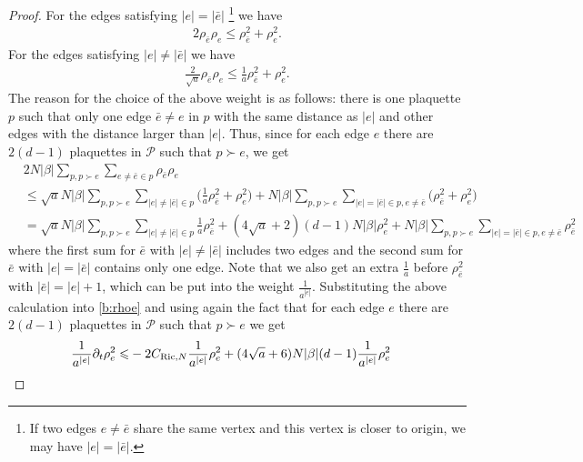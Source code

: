 \documentclass[11pt,UTF-8,reqno]{amsart}
\numberwithin{equation}{section}
\def\p{\partial}
\def\Ric{{\rm Ricci}}
\def\cP{{\mathcal P}}
\def\leq{\leqslant}
\def\p{\partial}
\def\Ric{{\rm Ric}}
\def\leq{\leqslant}
\begin{document}
\begin{proof}
\noindent For the edges satisfying $|e|= |\bar e|$ \footnote{If two edges $e\neq \bar e$ share the same vertex and this vertex is  closer to origin,  we may have $|e|= |\bar e|$.} we have
\begin{align*}
	2\rho_{\bar e}\rho_e\leq \rho_{\bar e}^2+\rho_e^2.
\end{align*}
For the edges satisfying $|e|\neq |\bar e|$  we have
\begin{align*}
	\frac2{\sqrt{a}}\rho_{\bar e}\rho_e\leq \frac1a\rho_{\bar e}^2+\rho_e^2.
\end{align*}
The reason for the choice of the above weight is as follows: there is one plaquette $p$ such that only one edge $\bar e\neq e$ in  $p$ with the same distance as $|e|$ and other edges  with the distance larger than $|e|$.
Thus, since for each edge $e$ there are
$2(d -1)$ plaquettes in $\cP$ such that $p\succ e$, we get
\begin{align*}
&2N|\beta|\sum_{p,p\succ e}\sum_{e\neq\bar e\in p}\rho_{\bar e}\rho_e
\\
&\leq \sqrt{a}N|\beta|  \sum_{p,p\succ e}  \sum_{|e|\neq|\bar e|\in p}\Big(\frac1a\rho_{\bar e}^2+\rho^2_e\Big)
+N|\beta|\sum_{p,p\succ e}\sum_{|e|=|\bar e|\in p,e\neq\bar e}
\Big(\rho_{\bar e}^2+\rho^2_e\Big)
\\
&=\sqrt{a}N|\beta|\sum_{p,p\succ e}\sum_{|e|\neq|\bar e|\in p}\frac1a\rho_{\bar e}^2+(4\sqrt{a}+2)(d-1)N|\beta|\rho^2_e+N|\beta|\sum_{p,p\succ e}\sum_{|e|=|\bar e|\in p,e\neq\bar e}\rho_{\bar e}^2
\end{align*}
where the first sum for $\bar e$ with $|e|\neq|\bar e|$ includes two edges and the second sum for $\bar e$ with $|e|=|\bar e|$ contains only one edge.
Note that we also get an extra $\frac1a$ before $\rho_{\bar e}^2$ with $|\bar e|=|e|+1$, which can be put into the weight $\frac1{a^{|\bar e|}}$. Substituting the above calculation into \eqref{b:rhoe} and using again the fact that for each edge $e$ there are
$2(d -1)$ plaquettes in $\cP$ such that $p\succ e$  we get
\begin{align*}
	\frac1{a^{|e|}}\p_t\rho_e^2\leq& -2C_{\Ric,N} \frac1{a^{|e|}}\rho_e^2+(4\sqrt{a}+6)N|\beta|(d-1)\frac1{a^{|e|}}\rho_e^2

\end{align*}
\end{proof}
\end{document}

